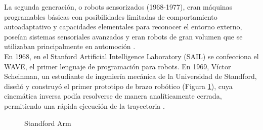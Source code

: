 
La segunda generación, o robots sensorizados (1968-1977), eran máquinas programables básicas con posibilidades limitadas de comportamiento autoadaptativo y capacidades elementales para reconocer el entorno externo, poseían sistemas sensoriales avanzados y eran robots de gran volumen que se utilizaban principalmente en automoción \cite{Zamalloa17}. \\

En 1968, en el Stanford Artificial Intelligence Laboratory (SAIL) se confecciona el WAVE, el primer lenguaje de programación para robots. En 1969, %
Víctor Scheinman, un estudiante de ingeniería mecánica de la Universidad de Standford, diseñó y construyó el primer prototipo de brazo robótico (Figura \ref{fig:standford_arm}), cuya cinemática inversa podía resolverse de manera analíticamente cerrada, permitiendo una rápida ejecución de la trayectoria \cite{Gasparetto19}. \\

  \begin{figure}[H]
    \begin{center}
      \subcapcentertrue
      \hspace{2mm}
    \end{center}
    \caption{Standford Arm}
    \label{fig:standford_arm}
  \end{figure}
 
